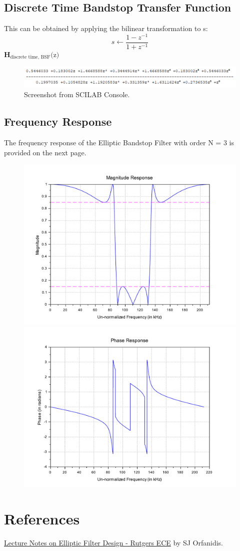 \documentclass[12pt]{article}
\begin{document}
\subsection{Discrete Time Bandstop Transfer Function}
This can be obtained by applying the bilinear transformation to s:
\[s \leftarrow \frac{1 - z^{-1}}{1 + z^{-1}}\]
\textbf{H$_{\text{discrete time, BSF}}\text{(z)}$}
\begin{figure}[h]
    \centering
    \includegraphics[width=\textwidth]{h_bs.png}
    \caption{Screenshot from SCILAB Console.}
\end{figure}


\subsection{Frequency Response}
The frequency response of the Elliptic Bandstop Filter with order N = 3 is provided on the next page.

\begin{figure}
    \centering
    \includegraphics[scale=0.6]{mag_bs.pdf}
    \includegraphics[scale=0.6]{phase_bs.pdf}
\end{figure}

\newpage
\section{References}
\href{https://www.ece.rutgers.edu/~orfanidi/ece521/notes.pdf}{Lecture Notes on Elliptic Filter Design - Rutgers ECE} by SJ Orfanidis.
\end{document}
